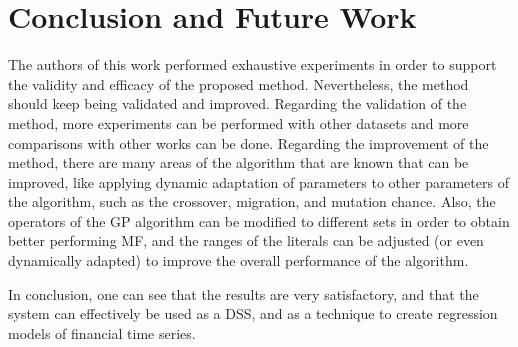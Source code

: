 \documentclass[a4paper,twoside]{article}
\begin{document}
\section{Conclusion and Future Work}
\label{conclusions}

The authors of this work performed exhaustive experiments in order to support the validity and efficacy of the proposed method. Nevertheless, the method should keep being validated and improved. Regarding the validation of the method, more experiments can be performed with other datasets and more comparisons with other works can be done. Regarding the improvement of the method, there are many areas of the algorithm that are known that can be improved, like applying dynamic adaptation of parameters to other parameters of the algorithm, such as the crossover, migration, and mutation chance. Also, the operators of the GP algorithm can be modified to different sets in order to obtain better performing MF, and the ranges of the literals can be adjusted (or even dynamically adapted) to improve the overall performance of the algorithm.

In conclusion, one can see that the results are very satisfactory, and that the system can effectively be used as a DSS, and as a technique to create regression models of financial time series.



\end{document}
